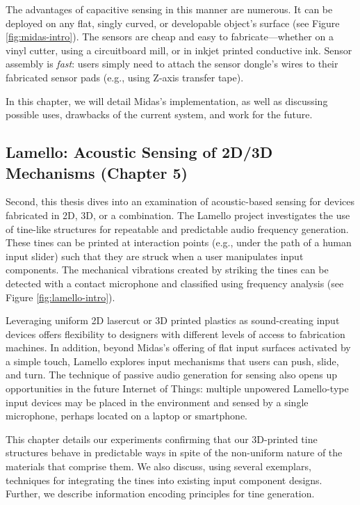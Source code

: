 The advantages of capacitive sensing in this manner are numerous. It can be deployed on any flat, singly curved, or developable object's surface (see Figure \ref{fig:midas-intro}). The sensors are cheap and easy to fabricate---whether on a vinyl cutter, using a circuitboard mill, or in inkjet printed conductive ink. Sensor assembly is \emph{fast}: users simply need to attach the sensor dongle's wires to their fabricated sensor pads (e.g., using Z-axis transfer tape).

In this chapter, we will detail Midas's implementation, as well as discussing possible uses, drawbacks of the current system, and work for the future.

\subsection{Lamello: Acoustic Sensing of 2D/3D Mechanisms (Chapter 5)}

Second, this thesis dives into an examination of acoustic-based sensing for devices fabricated in 2D, 3D, or a combination. The Lamello project investigates the use of tine-like structures for repeatable and predictable audio frequency generation. These tines can be printed at interaction points (e.g., under the path of a human input slider) such that they are struck when a user manipulates input components. The mechanical vibrations created by striking the tines can be detected with a contact microphone and classified using frequency analysis (see Figure \ref{fig:lamello-intro}).

Leveraging uniform 2D lasercut or 3D printed plastics as sound-creating input devices offers flexibility to designers with different levels of access to fabrication machines. In addition, beyond Midas's offering of flat input surfaces activated by a simple touch, Lamello explores input mechanisms that users can push, slide, and turn. The technique of passive audio generation for sensing also opens up opportunities in the future Internet of Things: multiple unpowered Lamello-type input devices may be placed in the environment and sensed by a single microphone, perhaps located on a laptop or smartphone.

This chapter details our experiments confirming that our 3D-printed tine structures behave in predictable ways in spite of the non-uniform nature of the materials that comprise them. We also discuss, using several exemplars, techniques for integrating the tines into existing input component designs. Further, we describe information encoding principles for tine generation.

